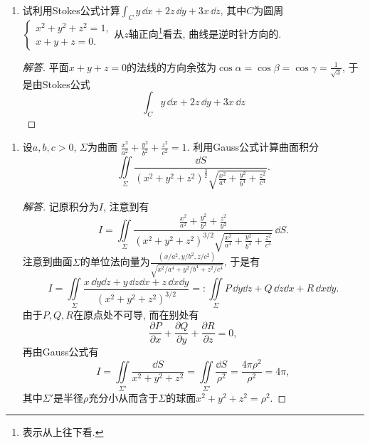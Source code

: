 \begin{quiza}
\begin{enumerate}
\item 试利用Stokes公式计算\(\int_Cy\,\dd x+2z\,\dd y+3x\,\dd z\), 
其中\(C\)为圆周\(\begin{cases}
x^2+y^2+z^2=1,\\x+y+z=0.
\end{cases}\)从\(z\)轴正向\footnote{表示从上往下看.}看去, 曲线是逆时针方向的.
\printfootnotes
\begin{proof}[解答]
平面\(x+y+z=0\)的法线的方向余弦为\(\cos\alpha=\cos\beta=\cos\gamma
=\frac{1}{\sqrt{3}}\), 于是由Stokes公式\[\int_Cy\,\dd x+2z\,\dd y+3x\,\dd z\]
\end{proof}
\end{enumerate}
\end{quiza}

\begin{quizb}
\begin{enumerate}
\item 设\(a,b,c>0\), \(\varSigma\)为曲面
\(\frac{x^2}{a^2}+\frac{y^2}{b^2}+\frac{z^2}{c^2}=1.\) 
利用Gauss公式计算曲面积分
\[\iint\limits_{\varSigma}\frac{\dd S}{(x^2+y^2+z^2)^{\frac{3}{2}}\sqrt{\displaystyle\frac{x^2}{a^4}+\frac{y^2}{b^4}+\frac{z^2}{c^4}}}.\]
\begin{proof}[解答]
记原积分为\(I\), 注意到有\[I=\iint\limits_{\varSigma}\frac{\displaystyle\frac{x^2}{a^2}+\frac{y^2}{b^2}+\frac{z^2}{y^2}}
{(x^2+y^2+z^2)^{3/2}\sqrt{\displaystyle\frac{x^2}{a^4}+\frac{y^2}{b^4}+\frac{z^2}{c^4}}}\,\dd S.\]
注意到曲面\(\varSigma\)的单位法向量为\(\frac{\left(x/a^2,y/b^2,z/c^2\right)}{\sqrt{x^2/a^4+y^2/b^4+z^2/c^4}}\), 
于是有\[I=\iint\limits_{\varSigma}\frac{x\,\dd y\dd z+y\,\dd z\dd x+z\,\dd x\dd y}{(x^2+y^2+z^2)^{3/2}}
=:\iint\limits_{\varSigma}P\,\dd y\dd z+Q\,\dd z\dd x+R\,\dd x\dd y.\]
由于\(P,Q,R\)在原点处不可导, 而在别处有
\[\frac{\partial P}{\partial x}+\frac{\partial Q}{\partial y}
+\frac{\partial R}{\partial z}=0,\]再由Gauss公式有
\[I=\iint\limits_{\varSigma'}\frac{\dd S}{x^2+y^2+z^2}
=\iint\limits_{\varSigma'}\frac{\dd S}{\rho^2}=\frac{4\pi\rho^2}{\rho^2}=4\pi,\]
其中\(\varSigma'\)是半径\(\rho\)充分小从而含于\(\varSigma\)的球面\(x^2+y^2+z^2=\rho^2\).
\end{proof}


\end{enumerate}
\end{quizb}
